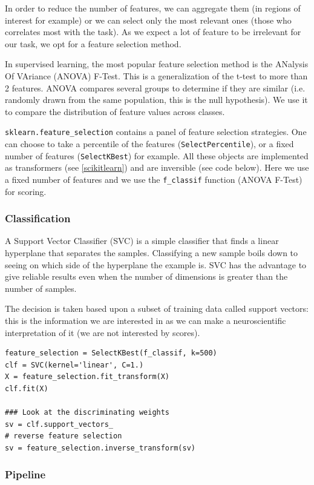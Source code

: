 \documentclass{frontiersSCNS} %
\begin{document}
In order to reduce the number of features, we can aggregate them (in regions of
interest for example) or we can select only the most relevant ones (those who
correlates most with the task). As we expect a lot of feature to be irrelevant
for our task, we opt for a feature selection method.

In supervised learning, the most popular feature selection method is the
ANalysis Of VAriance (ANOVA) F-Test. This is a generalization of the t-test to
more than 2 features. ANOVA compares several
groups to determine if they are similar (i.e. randomly drawn from the same
population, this is the null hypothesis). We use it to compare the distribution
of feature values across classes.

\verb!sklearn.feature_selection! contains a panel of feature selection
strategies. One can choose to take a percentile of the features
(\verb!SelectPercentile!), or a fixed number of features (\verb!SelectKBest!)
for example. All these objects are implemented as transformers (see
\ref{scikitlearn}) and are inversible (see code below).
Here we use a fixed number of features and we use the \verb!f_classif! function
(ANOVA F-Test) for scoring.

\subsubsection{Classification}

A Support Vector Classifier (SVC) is a simple classifier that finds a linear
hyperplane that separates the samples. Classifying a new sample boils down to
seeing on which side of the hyperplane the example is. SVC has the advantage to
give reliable results even when the number of dimensions is greater than the
number of samples.

The decision is taken based upon a subset of training data called support
vectors: this is the information we are interested in as we can make a
neuroscientific interpretation of it (we are not interested by scores).

\begin{lstlisting}
feature_selection = SelectKBest(f_classif, k=500)
clf = SVC(kernel='linear', C=1.)
X = feature_selection.fit_transform(X)
clf.fit(X)

### Look at the discriminating weights
sv = clf.support_vectors_
# reverse feature selection
sv = feature_selection.inverse_transform(sv)
\end{lstlisting}

\subsubsection{Pipeline}
\end{document}
